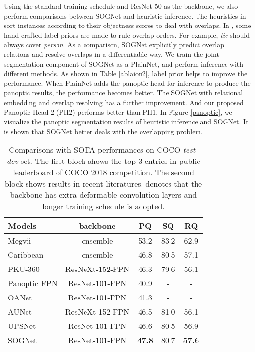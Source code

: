 \documentclass[letterpaper]{article} \usepackage{aaai20}  \usepackage{times}  \usepackage{helvet} \usepackage{courier}  \usepackage[hyphens]{url}  \usepackage{graphicx} \urlstyle{rm} \def\UrlFont{\rm}  \usepackage{graphicx}  \frenchspacing  \setlength{\pdfpagewidth}{8.5in}  \setlength{\pdfpageheight}{11in}
\begin{document}
Using the standard training schedule and ResNet-50 as the backbone, we also perform comparisons between SOGNet and heuristic inference. The heuristics in \cite{kirillov2018panoptic} sort instances according to their objectness scores to deal with overlaps. In \cite{li2018attention}, some hand-crafted label priors are made to rule overlap orders. For example, \emph{tie} should always cover \emph{person}. As a comparison, SOGNet explicitly predict overlap relations and resolve overlaps in a differentiable way. We train the joint segmentation component of SOGNet as a PlainNet, and perform inference with different methods. As shown in Table \ref{ablaion2}, label prior helps to improve the performance. When PlainNet adds the panoptic head for inference to produce the panoptic results, the performance becomes better. The SOGNet with relational embedding and overlap resolving has a further improvement. And our proposed Panoptic Head 2 (PH2) performs better than PH1. In Figure \ref{panoptic}, we visualize the panoptic segmentation results of heuristic inference and SOGNet. It is shown that SOGNet better deals with the overlapping problem. 






\begin{table}
	\renewcommand\arraystretch{1.25}
	\centering
\begin{tabular}{l|c|ccc}
			\hline Models & backbone & PQ & SQ & RQ \\
			\hline Megvii & ensemble & 53.2 & 83.2 & 62.9\\
			Caribbean & ensemble & 46.8 & 80.5 & 57.1\\
			PKU-360 & ResNeXt-152-FPN & 46.3 & 79.6 & 56.1\\
			\hline Panoptic FPN & ResNet-101-FPN & 40.9 & - & -\\
			OANet & ResNet-101-FPN & 41.3 & - & -\\
			AUNet & ResNeXt-152-FPN & 46.5 & 81.0 & 56.1\\
			UPSNet & ResNet-101-FPN & 46.6 & 80.5 & 56.9\\
			\hline SOGNet & ResNet-101-FPN & \textbf{47.8} & 80.7 & \textbf{57.6}\\
			\hline \end{tabular}
\caption{Comparisons with SOTA performances on COCO \emph{test-dev} set. The first block shows the top-3 entries in public leaderboard of COCO 2018 competition. The second block shows results in recent literatures.  denotes that the backbone has extra deformable convolution layers and longer training schedule is adopted.}
	\label{cocotest}
\end{table}
\end{document}
